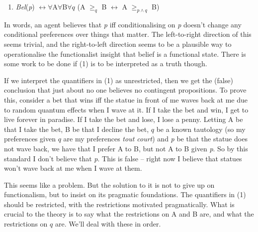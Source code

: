 \documentclass[
  11pt,
  letterpaper,
  DIV=11,
  numbers=noendperiod,
  oneside]{scrartcl}
\providecommand{\tightlist}{%
  \setlength{\itemsep}{0pt}\setlength{\parskip}{0pt}}\usepackage{longtable,booktabs,array}
\begin{document}
\begin{enumerate}
\def\labelenumi{\arabic{enumi}.}
\tightlist
\item
  \emph{Bel}(\emph{p})
  \(\leftrightarrow \forall\)A\(\forall\)B\(\forall q\) (A \(\geq _q\) B
  \(\leftrightarrow\) A \(\geq _{p \wedge q}\) B)
\end{enumerate}

In words, an agent believes that \emph{p} iff conditionalising on
\emph{p} doesn't change any conditional preferences over things that
matter. The left-to-right direction of this
seems trivial, and the right-to-left direction seems to be a plausible
way to operationalise the functionalist insight that belief is a
functional state. There is some work to be done if (1) is to be
interpreted as a truth though.

If we interpret the quantifiers in (1) as unrestricted, then we get the
(false) conclusion that just about no one believes no contingent
propositions. To prove this, consider a bet that wins iff the statue in
front of me waves back at me due to random quantum effects when I wave
at it. If I take the bet and win, I get to live forever in paradise. If
I take the bet and lose, I lose a penny. Letting A be that I take the
bet, B be that I decline the bet, \(q\) be a known tautology (so my
preferences given \(q\) are my preferences \emph{tout court}) and
\emph{p} be that the statue does not wave back, we have that I prefer A
to B, but not A to B given \emph{p}. So by this standard I don't believe
that \emph{p}. This is false -- right now I believe that statues won't
wave back at me when I wave at them.

This seems like a problem. But the solution to it is not to give up on
functionalism, but to insist on its pragmatic foundations. The
quantifiers in (1) should be restricted, with the restrictions motivated
pragmatically. What is crucial to the theory is to say what the
restrictions on A and B are, and what the restrictions on \(q\) are.
We'll deal with these in order.
\end{document}
